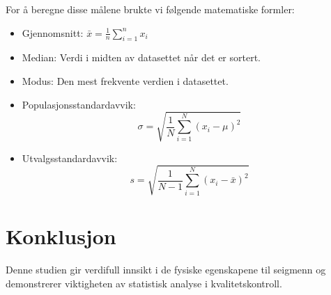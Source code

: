 \documentclass{article}
\begin{document}
For å beregne disse målene brukte vi følgende matematiske formler:
\begin{itemize}
    \item Gjennomsnitt: $\bar{x} = \frac{1}{n}\sum_{i=1}^{n} x_i$
    \item Median: Verdi i midten av datasettet når det er sortert.
    \item Modus: Den mest frekvente verdien i datasettet.
    \item Populasjonsstandardavvik: 
    \[
    \sigma = \sqrt{\frac{1}{N}\sum_{i=1}^{N}(x_i - \mu)^2}
    \]
    \item Utvalgsstandardavvik: 
    \[
    s = \sqrt{\frac{1}{N-1}\sum_{i=1}^{N}(x_i - \bar{x})^2}
    \]
\end{itemize}

\section{Konklusjon}
Denne studien gir verdifull innsikt i de fysiske egenskapene til seigmenn og demonstrerer viktigheten av statistisk analyse i kvalitetskontroll.
\end{document}
